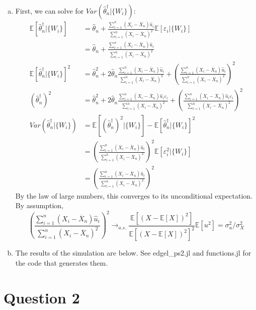 \documentclass{article}
\newcommand{\olx}[1]{\overline{X}_{#1}}
\newcommand{\sumn}{\sum_{i=1}^{n}}
\newcommand{\eps}{\varepsilon}
\newcommand{\that}{\hat{\theta}_n}
\newcommand{\tchat}{\that^\dagger}
\newcommand{\E}[1]{\mathbb{E}\left[#1\right]}%
\begin{document}
\begin{enumerate}[(a)]
    \item First, we can solve for ${Var(\tchat|\{W_i\})}$:\begin{align*}
        \E{\tchat|\{W_i\}} &= \that + \frac{\sumn(X_i - \olx{n})\hat{u}_i}{\sumn(X_i - \olx{n})^2}\E{\eps_i|\{W_i\}} \\
                    &= \that + \frac{\sumn(X_i - \olx{n})\hat{u}_i}{\sumn(X_i - \olx{n})^2}  \\
        \E{\tchat|\{W_i\}}^2 &=  \that^2 + 2\that\frac{\sumn(X_i - \olx{n})\hat{u}_i}{\sumn(X_i - \olx{n})^2} + \left(\frac{\sumn(X_i - \olx{n})\hat{u}_i}{\sumn(X_i - \olx{n})^2}\right)^2    \\
        (\tchat)^2 &= \that^2 + 2\that\frac{\sumn(X_i - \olx{n})\hat{u}_i\eps_i}{\sumn(X_i - \olx{n})^2} + \left(\frac{\sumn(X_i - \olx{n})\hat{u}_i\eps_i}{\sumn(X_i - \olx{n})^2}\right)^2   \\
        Var(\tchat|\{W_i\}) &= \E{(\tchat)^2|\{W_i\}} - \E{\tchat|\{W_i\}}^2 \\
            &= \left(\frac{\sumn(X_i - \olx{n})\hat{u}_i}{\sumn(X_i - \olx{n})^2}\right)^2\E{\eps_i^2|\{W_i\}}    \\
            &= \left(\frac{\sumn(X_i - \olx{n})\hat{u}_i}{\sumn(X_i - \olx{n})^2}\right)^2
    \end{align*}
    By the law of large numbers, this converges to its unconditional expectation. By assumption,\[
        \left(\frac{\sumn(X_i - \olx{n})\hat{u}_i}{\sumn(X_i - \olx{n})^2}\right)^2 \rightarrow_{a.s.} \frac{\E{(X-\E{X})^2}}{\E{(X-\E{X})^2}^2}\E{u^2} = \sigma_u^2/\sigma_X^2
    \]

    \item The results of the simulation are below. See edgel\_ps2.jl and functions.jl for the code that generates them.
        \begin{center}
            
        \end{center}
\end{enumerate}
\pagebreak
\section*{Question 2}
\end{document}
